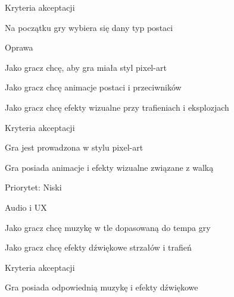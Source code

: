 Kryteria akceptacji \begin{DoxyVerb}Na początku gry wybiera się dany typ postaci 
\end{DoxyVerb}


Oprawa \begin{DoxyVerb}Jako gracz chcę, aby gra miała styl pixel-art 

Jako gracz chcę animacje postaci i przeciwników 

Jako gracz chcę efekty wizualne przy trafieniach i eksplozjach 
\end{DoxyVerb}


Kryteria akceptacji \begin{DoxyVerb}Gra jest prowadzona w stylu pixel-art 

Gra posiada animacje i efekty wizualne związane z walką 
\end{DoxyVerb}


Priorytet:\+ Niski

Audio i UX \begin{DoxyVerb}Jako gracz chcę muzykę w tle dopasowaną do tempa gry 

Jako gracz chcę efekty dźwiękowe strzałów i trafień 
\end{DoxyVerb}


Kryteria akceptacji \begin{DoxyVerb}Gra posiada odpowiednią muzykę i efekty dźwiękowe 
\end{DoxyVerb}
 